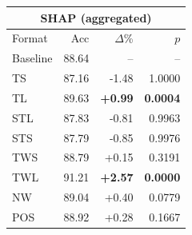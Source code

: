 \begin{tabular}{lrrr}
\toprule
\multicolumn{4}{c}{\textbf{SHAP (aggregated)}} \\
\midrule
Format & Acc & $\Delta$\% & $p$ \\
\midrule
Baseline & 88.64 & -- & -- \\
\midrule
TS & 87.16 & -1.48 & 1.0000 \\
TL & 89.63 & \textbf{+0.99} & \textbf{0.0004} \\
STL & 87.83 & -0.81 & 0.9963 \\
STS & 87.79 & -0.85 & 0.9976 \\
TWS & 88.79 & +0.15 & 0.3191 \\
TWL & 91.21 & \textbf{+2.57} & \textbf{0.0000} \\
NW & 89.04 & +0.40 & 0.0779 \\
POS & 88.92 & +0.28 & 0.1667 \\
\bottomrule
\end{tabular}